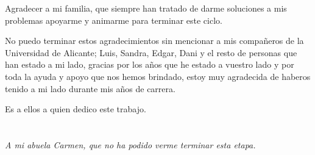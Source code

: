 Agradecer a mi familia, que siempre han tratado de darme soluciones a mis problemas apoyarme y animarme para terminar este ciclo.

No puedo terminar estos agradecimientos sin mencionar a mis compañeros de la Universidad de Alicante; Luis, Sandra, Edgar, Dani y el resto de personas que han estado a mi lado, gracias por los años que he estado a vuestro lado y por toda la ayuda y apoyo que nos hemos brindado, estoy muy agradecida de haberos tenido a mi lado durante mis años de carrera.

Es a ellos a quien dedico este trabajo.


\cleardoublepage %
\chapter*{}
\setlength{\leftmargin}{0.5\textwidth}
\setlength{\parsep}{0cm}
\addtolength{\topsep}{0.5cm}
\begin{flushright}
\small\em{
A mi abuela Carmen, que no ha podido verme terminar esta etapa.\\
}
\end{flushright}

\cleardoublepage %
